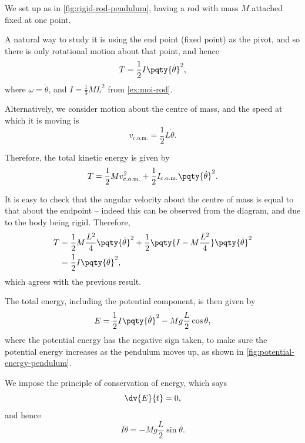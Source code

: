 \begin{example}
    \label{ex:rigid-rod-pendulum}%
    We set up as in \autoref{fig:rigid-rod-pendulum}, having a rod with mass \(M\) attached fixed at one point.

    A natural way to study it is using the end point (fixed point) as the pivot, and so there is only rotational motion about that point, and hence
    \begin{equation}
        T = \frac{1}{2} I \pqty{\dot{\theta}}^2,
    \end{equation}
    where \(\omega = \dot{\theta}\), and \(I = \frac{1}{3} M L^2\) from \autoref{ex:moi-rod}.

    Alternatively, we consider motion about the centre of mass, and the speed at which it is moving is
    \begin{equation}
        v_{\text{c.o.m.}} = \frac{1}{2} L \dot{\theta}.
    \end{equation}

    Therefore, the total kinetic energy is given by
    \begin{equation}
        T = \frac{1}{2} M v_{\text{c.o.m.}}^2 + \frac{1}{2} I_{\text{c.o.m.}} \pqty{\dot{\theta}}^2.
    \end{equation}

    It is easy to check that the angular velocity about the centre of mass is equal to that about the endpoint -- indeed this can be observed from the diagram, and due to the body being rigid. Therefore,
    \begin{subequations}\begin{align}
        T &= \frac{1}{2} M \frac{L^2}{4} \pqty{\dot{\theta}}^2 + \frac{1}{2} \pqty{I - M \frac{L^2}{4}} \pqty{\dot{\theta}}^2 \\
        &= \frac{1}{2} I \pqty{\dot{\theta}}^2,
    \end{align}\end{subequations}
    which agrees with the previous result.

    The total energy, including the potential component, is then given by
    \begin{equation}
        E = \frac{1}{2} I \pqty{\dot{\theta}}^2 - Mg \frac{L}{2} \cos \theta,
    \end{equation}
    where the potential energy has the negative sign taken, to make sure the potential energy increases as the pendulum moves up, as shown in \autoref{fig:potential-energy-pendulum}.

    We impose the principle of conservation of energy, which says
    \begin{equation}
        \dv{E}{t} = 0,
    \end{equation}
    and hence
    \begin{equation}
        \boxed{I \ddot{\theta} = - Mg \frac{L}{2} \sin \theta.}
    \end{equation}
\end{example}

